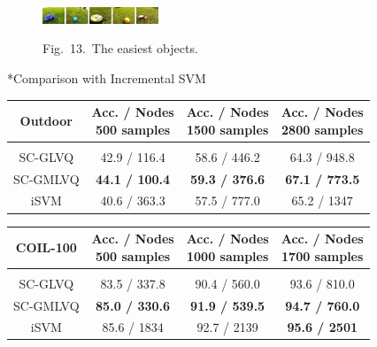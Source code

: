 \documentclass{article}
\makeatletter
\renewcommand{\subsection}{%
\@startsection{subsection}{1}{0pt}{2ex}{1ex}{%
\color[rgb]{0,0.4078,0.7059}
\fontsize{11mm}{11mm}\sffamily\bfseries}}
\makeatother
\begin{document}
\begin{multicols}{3}
\begin{figure}[H]
\begin{center}
\includegraphics[width=0.31\textwidth]{Images/Outdoor/Easy.jpg}
\end{center}
\begin{center}
{\myCaption Fig.~13.~The easiest objects.} 
\end{center}
\end{figure}



\subsection*{Comparison with Incremental SVM \cite{Dl13}}

\begin{center}
\fontsize{8.5mm}{9.25mm}\sffamily
\begin{tabular}{c|ccc}
\textit{} Outdoor& \shortstack{Acc. / Nodes  \\500 samples} & \shortstack{Acc. / Nodes  \\1500 samples} & \shortstack{Acc. / Nodes  \\2800 samples}\\ \hline \\ [-1.5ex]
\rule{0pt}{10pt}
SC-GLVQ & 42.9 / 116.4 & 58.6 / 446.2& 64.3 / 948.8\\
SC-GMLVQ & \textbf{44.1 / 100.4} & \textbf{59.3 / 376.6} & \textbf{67.1 / 773.5}\\
iSVM & 40.6 / 363.3 & 57.5 / 777.0 & 65.2 / 1347\\
\end{tabular}
\end{center}

\begin{center}
\fontsize{8.5mm}{9.25mm}\sffamily
\begin{tabular}{c|ccc}
\textit{} COIL-100& \shortstack{Acc. / Nodes  \\500 samples}  & \shortstack{Acc. / Nodes  \\1000 samples}  & \shortstack{Acc. / Nodes  \\1700 samples}\\ \hline \\ [-1.5ex]
\rule{0pt}{10pt}
SC-GLVQ & 83.5 / 337.8 & 90.4 / 560.0  & 93.6 / 810.0\\
SC-GMLVQ & \textbf{85.0 / 330.6} & \textbf{91.9 / 539.5}& \textbf{94.7 / 760.0}\\
iSVM & 85.6 / 1834  & 92.7 / 2139 & \textbf{95.6 / 2501}\\
\end{tabular}
\end{center}



\end{multicols}
\end{document}
